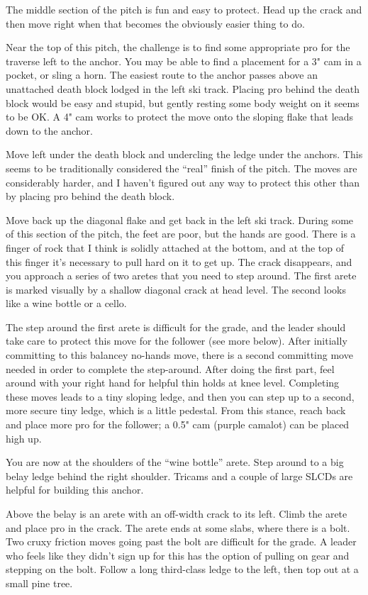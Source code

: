 \documentclass{tahquitz}
\begin{document}
The middle section of the pitch is fun and easy to protect.
Head up the crack and then move right when that becomes the obviously
easier thing to do.

Near the top of this pitch, the challenge is to
find some appropriate pro for the traverse left to the anchor.
You may be able to find a placement for a 3" cam in a pocket, or
sling a horn. The easiest route to the anchor passes above an unattached
death block lodged in the left ski track. Placing pro behind the death block
would be easy and stupid, but gently resting some body weight on it seems
to be OK. A 4" cam works to protect the move onto the sloping flake that
leads down to the anchor.

 Move left under the death block and undercling the ledge
under the anchors. This seems to be traditionally considered the ``real'' finish of the pitch.
The moves are considerably harder, and I haven't figured out any way to protect this other
than by placing pro behind the death block.

 Move back up the diagonal flake and get back in the left ski track.
During some of this section of the pitch, the feet are poor, but the hands are good.
There is a finger of rock that I think is solidly attached at the bottom, and at the top
of this finger it's necessary to pull hard on it to get up. The crack disappears,
and you approach a series of two aretes that you need to step around.
The first
arete is marked visually by a shallow diagonal crack at head level. The second
looks like a wine bottle or a cello.

The step
around the first arete is difficult for the grade, and the leader should take
care to protect this move for the follower (see more below). After initially committing
to this balancey no-hands move, there is a second committing move needed in order
to complete the step-around. After doing the first part, feel around with your
right hand for helpful thin holds at knee level. Completing these moves
leads to a tiny sloping ledge, and then you can step up to a second, more secure tiny
ledge, which is a little pedestal. From this stance, reach back and place more pro
for the follower; a 0.5" cam (purple camalot) can be placed high up. 

You are now at the shoulders of the ``wine bottle'' arete. Step around to
a big belay ledge behind the right shoulder. Tricams and a couple of
large SLCDs are helpful for building this anchor.

 Above the belay is an arete with an off-width crack to its left.
Climb the arete and place pro in the crack. The arete ends at some
slabs, where there is a bolt. Two cruxy friction moves going past the bolt are difficult for
the grade. A leader who feels like they didn't sign up for this has the option
of pulling on gear and stepping on the bolt. Follow a long third-class ledge to
the left, then top out at a small pine tree.
\end{document}
